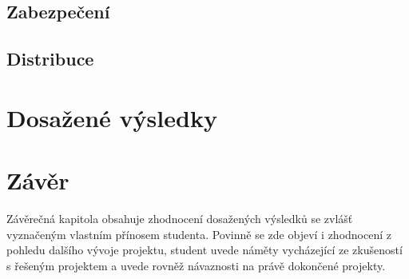 \section{Zabezpečení}
\section{Distribuce}

\chapter{Dosažené výsledky}

\chapter{Závěr}
Závěrečná kapitola obsahuje zhodnocení dosažených výsledků se zvlášť vyznačeným vlastním přínosem studenta. Povinně se zde objeví i zhodnocení z pohledu dalšího vývoje projektu, student uvede náměty vycházející ze zkušeností s řešeným projektem a uvede rovněž návaznosti na právě dokončené projekty.

